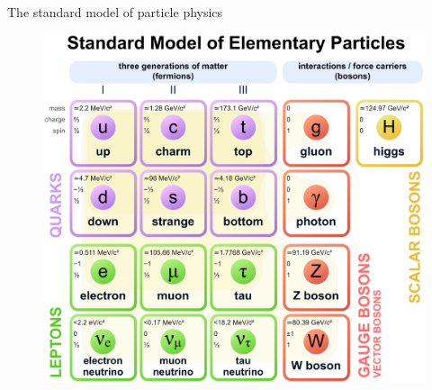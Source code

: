 \begin{frame}{The standard model of particle physics}
\begin{figure}
    \centering
    \includegraphics[scale=0.17]{Standard_Model_of_Elementary_Particles.eps}
    \caption{\cite{standard_model}}
    \label{fig:my_label}
\end{figure}
\end{frame}

